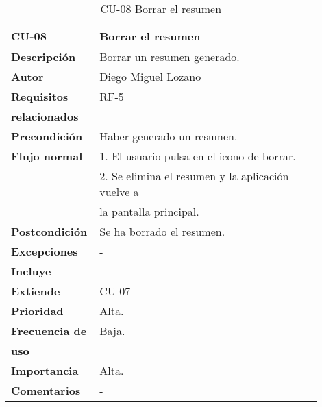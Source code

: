 \begin{longtable}{>{\raggedright}b{0.2\linewidth}>{\raggedright\arraybackslash}b{0.7\linewidth}}
	\toprule
	\textbf{CU-08} & \textbf{Borrar el resumen} \\
	\toprule
	\endhead
	
	\toprule
	\caption{CU-08 Borrar el resumen}
	\endfoot
	
	\small{\textbf{Descripción}} & Borrar un resumen generado. \\
	\small{\textbf{Autor}} & Diego Miguel Lozano \\
	\small{\textbf{Requisitos}} & RF-5  \\
	\small{\textbf{relacionados}} & \\
	\small{\textbf{Precondición}} & Haber generado un resumen. \\
	\small{\textbf{Flujo normal}} & \quad \small{1. El usuario pulsa en el icono de borrar.} \\
	 & \quad \small{2. Se elimina el resumen y la aplicación vuelve a} \\
	 & \qquad \small{la pantalla principal.} \\
	\small{\textbf{Postcondición}} & Se ha borrado el resumen. \\
	\small{\textbf{Excepciones}} & - \\
	\small{\textbf{Incluye}} & - \\
	\small{\textbf{Extiende}} & CU-07 \\
	\small{\textbf{Prioridad}} & Alta. \\
	\small{\textbf{Frecuencia de}} & Baja. \\
	\small{\textbf{uso}} & \\
	\small{\textbf{Importancia}} & Alta. \\
	\small{\textbf{Comentarios}} & - \\
\end{longtable}